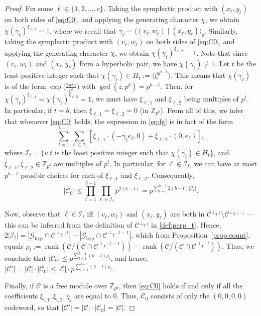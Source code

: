 \documentclass{article}
\DeclareMathOperator{\rank}{rank}
\theoremstyle{remark}
\theoremstyle{definition}
\numberwithin{equation}{section}
\begin{document}
\begin{proof}
Fix some $\ell \in \{1,2,\ldots,c\}$. Taking the symplectic product with $(x_{\ell},y_{\ell})$ on both sides of \eqref{eq:C0}, and applying the generating character $\chi$, we obtain ${\chi(\gamma_\ell)}^{\xi_{\ell,1}} = 1$, where we recall that $\gamma_\ell = \langle(v_\ell,w_\ell) \mid (x_\ell,y_\ell)\rangle_{\text{s}}$. Similarly, taking the symplectic product with $(v_{\ell},w_{\ell})$ on both sides of \eqref{eq:C0}, and applying the generating character $\chi$, we obtain ${\chi(\gamma_\ell)}^{\xi_{\ell,2}} = 1$. Note that since $(v_{\ell},w_{\ell})$ and $(x_{\ell},y_{\ell})$ form a hyperbolic pair, we have $\chi(\gamma_\ell) \neq 1$. Let $t$ be the least positive integer such that $\chi(\gamma_\ell) \in H_t := \langle \zeta^{p^{b-t}} \rangle$. This means that $\chi(\gamma_\ell)$ is of the form $\exp\bigl(\frac{2\pi i \, z}{p^b}\bigr)$ with $\gcd(z,p^b) = p^{b-t}$. Then, for ${\chi(\gamma_\ell)}^{\xi_{\ell,1}} = {\chi(\gamma_\ell)}^{\xi_{\ell,2}} = 1$, we must have $\xi_{\ell,1}$ and $\xi_{\ell,2}$ being multiples of $p^t$. In particular, if $t=b$, then $\xi_{\ell,1}=\xi_{\ell,2}=0$ (in $\mathbb{Z}_{p^b}$). From all of this, we infer that whenever \eqref{eq:C0} holds, the expression in \eqref{eq:fg} is in fact of the form 
\begin{equation*}
\sum_{t = 1}^{b-1} \sum_{\ell \in \mathcal{I}_t} [\xi_{\ell,1} \cdot (-\gamma_\ell e_\ell,0) + \xi_{\ell,2} \cdot (0,e_\ell)],
\end{equation*}
where $\mathcal{I}_t = \{i : \text{$t$ is the least positive integer such that $\chi(\gamma_i) \in H_t$}\}$, and $\xi_{\ell,1},\xi_{\ell,2} \in \mathbb{Z}_{p^b}$ are multiples of $p^t$. In particular, for $\ell \in \mathcal{I}_t$, we can have at most $p^{b-t}$ possible choices for each of $\xi_{\ell,1}$ and $\xi_{\ell,2}$. Consequently, 
$$
|\mathcal{C}_0| \le \prod_{t=1}^{b-1} \prod_{\ell \in \mathcal{I}_t} p^{2(b-t)} = p^{\sum_{t=1}^{b-1} 2(b-t)|\mathcal{I}_t|}.
$$

Now, observe that $\ell \in \mathcal{I}_t$ iff $(v_{\ell},w_{\ell})$ and $(x_\ell,y_\ell)$ are both in $\mathcal{C}^{\perp_{\chi,t}} \setminus \mathcal{C}^{\perp_{\chi,t-1}}$ --- this can be inferred from the definition of $\mathcal{C}^{\perp_{\chi,t}}$ in \eqref{def:perp_t}. Hence, $2|\mathcal{I}_t| = \left|\mathcal{G}_{\mathrm{hyp}} \cap \mathcal{C}^{\perp_\chi,t} \right| - \left|\mathcal{G}_{\mathrm{hyp}} \cap \mathcal{C}^{\perp_\chi,t-1} \right|$, which from Proposition~\ref{prop:count}, equals $\rho_t := \rank(\mathcal{C}/(\mathcal{C} \cap \mathcal{C}^{\perp_\chi,t-1}))-\rank(\mathcal{C}/(\mathcal{C} \cap \mathcal{C}^{\perp_\chi,t}))$. Thus, we conclude that $|\mathcal{C}_0| \le p^{\sum_{t=1}^{b-1} (b-t) \rho_t}$, and hence, $|\mathcal{C}'| = |\mathcal{C}|\cdot |\mathcal{C}_0|  \le |\mathcal{C}| \cdot p^{\sum_{t=1}^{b-1} (b-t) \rho_t}$.

Finally, if $\mathcal{C}$ is a free module over $\mathbb{Z}_{p^b}$, then \eqref{eq:C0} holds if and only if all the coefficients $\xi_{i,1},\xi_{i,2},\eta_j$ are equal to $0$. Thus, $\mathcal{C}_0$ consists of only the $(0,0,0,0)$ codeword, so that $|\mathcal{C}'|=|\mathcal{C}|\cdot |\mathcal{C}_0| = |\mathcal{C}|$.
\end{proof}
\end{document}
